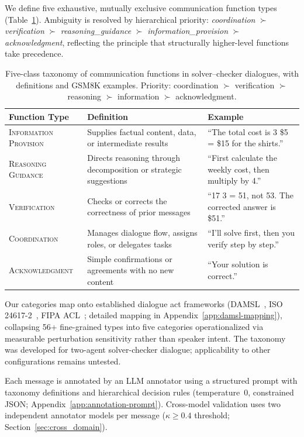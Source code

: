 We define five exhaustive, mutually exclusive communication function types (Table~\ref{tab:taxonomy}). Ambiguity is resolved by hierarchical priority: \textit{coordination} $\succ$ \textit{verification} $\succ$ \textit{reasoning\_guidance} $\succ$ \textit{information\_provision} $\succ$ \textit{acknowledgment}, reflecting the principle that structurally higher-level functions take precedence.

\begin{table}[t]
\centering
\caption{Five-class taxonomy of communication functions in solver--checker dialogues, with definitions and GSM8K examples. Priority: coordination $\succ$ verification $\succ$ reasoning $\succ$ information $\succ$ acknowledgment.}
\label{tab:taxonomy}
\small
\begin{tabular}{@{}p{2.8cm}p{4.2cm}p{4.8cm}@{}}
\toprule
\textbf{Function Type} & \textbf{Definition} & \textbf{Example} \\
\midrule
\textsc{Information Provision} & Supplies factual content, data, or intermediate results & ``The total cost is 3 \texttimes{} \$5 = \$15 for the shirts.'' \\
\addlinespace
\textsc{Reasoning Guidance} & Directs reasoning through decomposition or strategic suggestions & ``First calculate the weekly cost, then multiply by 4.'' \\
\addlinespace
\textsc{Verification} & Checks or corrects the correctness of prior messages & ``17 \texttimes{} 3 = 51, not 53. The corrected answer is \$51.'' \\
\addlinespace
\textsc{Coordination} & Manages dialogue flow, assigns roles, or delegates tasks & ``I'll solve first, then you verify step by step.'' \\
\addlinespace
\textsc{Acknowledgment} & Simple confirmations or agreements with no new content & ``Your solution is correct.'' \\
\bottomrule
\end{tabular}
\end{table}

Our categories map onto established dialogue act frameworks (DAMSL~\cite{core_damsl_1997}, ISO 24617-2~\cite{bunt_iso_2012}, FIPA ACL~\cite{fipa_acl_2002}; detailed mapping in Appendix~\ref{app:damsl-mapping}), collapsing 56+ fine-grained types into five categories operationalized via measurable perturbation sensitivity rather than speaker intent. The taxonomy was developed for two-agent solver-checker dialogue; applicability to other configurations remains untested.

\label{sec:annotation_protocol}
Each message is annotated by an LLM annotator using a structured prompt with taxonomy definitions and hierarchical decision rules (temperature~0, constrained JSON; Appendix~\ref{app:annotation-prompt}). Cross-model validation uses two independent annotator models per message ($\kappa \geq 0.4$ threshold; Section~\ref{sec:cross_domain}).
